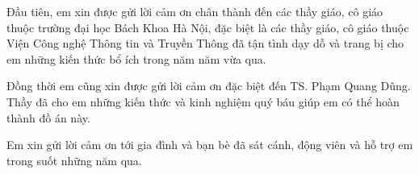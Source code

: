 
\begin{acknowledgements}

Đầu tiên, em xin được gửi lời cảm ơn chân thành đến các thầy giáo,
cô giáo thuộc trường đại học Bách Khoa Hà Nội, đặc biệt là các thầy
giáo, cô giáo thuộc Viện Công nghệ Thông tin và Truyền Thông đã tận
tình dạy dỗ và trang bị cho em những kiến thức bổ ích trong năm năm vừa qua.

Đồng thời em cũng xin được gửi lời cảm ơn đặc biệt đến TS. Phạm Quang Dũng.
Thầy đã cho em những kiến thức và kinh nghiệm quý báu giúp em có
thể hoàn thành đồ án này.

Em xin gửi lời cảm ơn tới gia đình và bạn bè đã sát cánh,
động viên và hỗ trợ em trong suốt những năm qua. 
\end{acknowledgements}
